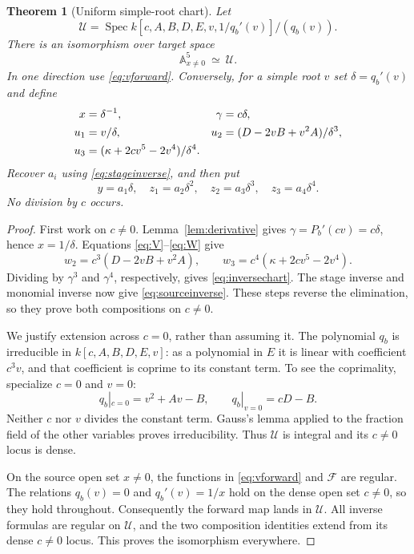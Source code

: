 \documentclass[11pt,a4paper]{article}
\newtheorem{theorem}{Theorem}[section]
\theoremstyle{definition}
\newcommand{\A}{\mathbb A}
\newcommand{\Spec}{\operatorname{Spec}}
\newcommand{\F}{\mathcal F}
\newcommand{\kk}{\kappa}
\begin{document}
\begin{theorem}[Uniform simple-root chart]\label{thm:chart}
Let
\[
 \mathcal U=\Spec k[c,A,B,D,E,v,1/q_b'(v)]/(q_b(v)).
\]
There is an isomorphism over target space
\[
 \A^5_{x\ne0}\ \simeq\ \mathcal U.
\]
In one direction use \eqref{eq:vforward}. Conversely, for a simple root
$v$ set $\delta=q_b'(v)$ and define
\begin{align}
 x&=\delta^{-1},& \gamma&=c\delta,\notag\\
 u_1&=v/\delta,&
 u_2&=(D-2vB+v^2A)/\delta^3,\label{eq:inversechart}\\
 u_3&=(\kk+2cv^5-2v^4)/\delta^4.&&\notag
\end{align}
Recover $a_i$ using \eqref{eq:stageinverse}, and then put
\begin{equation}\label{eq:sourceinverse}
 y=a_1\delta,\quad z_1=a_2\delta^2,\quad
 z_2=a_3\delta^3,\quad z_3=a_4\delta^4.
\end{equation}
No division by $c$ occurs.
\end{theorem}
\begin{proof}
First work on $c\ne0$. Lemma~\ref{lem:derivative} gives
$\gamma=P_b'(cv)=c\delta$, hence $x=1/\delta$.
Equations \eqref{eq:V}--\eqref{eq:W} give
\[
 w_2=c^3(D-2vB+v^2A),\qquad
 w_3=c^4(\kk+2cv^5-2v^4).
\]
Dividing by $\gamma^3$ and $\gamma^4$, respectively, gives
\eqref{eq:inversechart}. The stage inverse and monomial inverse now give
\eqref{eq:sourceinverse}. These steps reverse the elimination, so they
prove both compositions on $c\ne0$.

We justify extension across $c=0$, rather than assuming it. The polynomial
$q_b$ is irreducible in $k[c,A,B,D,E,v]$: as a polynomial in $E$ it is
linear with coefficient $c^3v$, and that coefficient is coprime to its
constant term. To see the coprimality, specialize $c=0$ and $v=0$:
\[
 q_b|_{c=0}=v^2+Av-B,\qquad q_b|_{v=0}=cD-B.
\]
Neither $c$ nor $v$ divides the constant term. Gauss's lemma applied to
the fraction field of the other variables proves irreducibility. Thus
$\mathcal U$ is integral and its $c\ne0$ locus is dense.

On the source open set $x\ne0$, the functions in \eqref{eq:vforward}
and $\F$ are regular. The relations $q_b(v)=0$ and
$q_b'(v)=1/x$ hold on the dense open set $c\ne0$, so they hold throughout.
Consequently the forward map lands in $\mathcal U$. All inverse formulas
are regular on $\mathcal U$, and the two composition identities extend
from its dense $c\ne0$ locus. This proves the isomorphism everywhere.
\end{proof}
\end{document}
